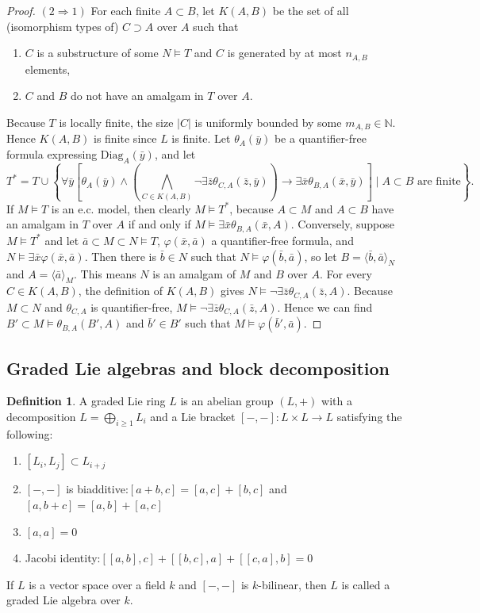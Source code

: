 \documentclass[11pt,reqno]{article}
\theoremstyle{definition}
\newtheorem{definition}[theorem]{Definition}
\theoremstyle{remark}
\newcommand{\N}{\mathbb{N}}
\begin{document}
\begin{proof}
    $(2\Rightarrow 1)$
    For each finite $A\subset B$, let $K(A,B)$ be the set of all (isomorphism types of) $C\supset A$ over $A$ such that
    \begin{enumerate}
        \item $C$ is a substructure of some $N\models T$ and $C$ is generated by at most $n_{A,B}$ elements,
        \item $C$ and $B$ do not have an amalgam in $T$ over $A$.
    \end{enumerate}
    Because $T$ is locally finite, the size $|C|$ is uniformly bounded by some $m_{A,B}\in\N$. 
    Hence $K(A,B)$ is finite since $L$ is finite.
    Let $\theta_A(\bar y)$ be a quantifier-free formula expressing $\mathrm{Diag}_A(\bar y)$, and let
    \[
        T^*=T\cup \left\{\forall \bar y\left[\theta_A(\bar y)\wedge\left(\bigwedge_{C\in K(A,B)}\neg\exists \bar z\theta_{C,A}(\bar z, \bar y)\right) \to \exists \bar x\theta_{B,A}(\bar x,\bar y)\right] \mid A\subset B\text{ are finite}\right\}. 
        \]
    If $M\models T$ is an e.c. model, then clearly $M\models T^*$, because $A\subset M$ and $A\subset B$ have an amalgam in $T$ over $A$ if and only if $M\models\exists \bar x\theta_{B,A}(\bar x,A)$.
    Conversely, suppose $M\models T^*$ and let $\bar a\subset M\subset N\models T$, $\varphi(\bar x,\bar a)$ a quantifier-free formula, and $N\models \exists \bar x\varphi(\bar x, \bar a)$.
    Then there is $\bar b\in N$ such that $N\models \varphi(\bar b,\bar a)$, so let $B=\langle \bar b,\bar a\rangle_N$ and $A=\langle \bar a\rangle_M$.
    This means $N$ is an amalgam of $M$ and $B$ over $A$.
    For every $C\in K(A,B)$, the definition of $K(A,B)$ gives $N\models \neg\exists \bar z\theta_{C,A}(\bar z, A)$.
    Because $M\subset N$ and $\theta_{C,A}$ is quantifier-free, $M\models \neg\exists \bar z\theta_{C,A}(\bar z, A)$. Hence we can find $B'\subset M\models \theta_{B,A}(B',A)$ and $\bar b'\in B'$ such that $M\models\varphi(\bar b',\bar a)$.
\end{proof}


\subsection{Graded Lie algebras and block decomposition}
\begin{definition}
    A graded Lie ring $L$ is an abelian group
    $(L,+)$ with a decomposition $L=\bigoplus_{i\geq 1}L_i$ and a Lie
    bracket $[-,-]:L\times L\to L$ satisfying the following:
    \begin{enumerate}
        \item $[L_i,L_j]\subset L_{i+j}$
        \item $[-,-]$ is biadditive:$[a+b,c]=[a,c]+[b,c]$ and $[a,b+c]=[a,b]+[a,c]$
        \item $[a,a]=0$
        \item Jacobi identity:$[[a,b],c]+[[b,c],a]+[[c,a],b]=0$
    \end{enumerate}
    If $L$ is a vector space over a field $k$ and $[-,-]$ is $k$-bilinear,
    then $L$ is called a graded Lie algebra over $k$.
\end{definition}
\end{document}
